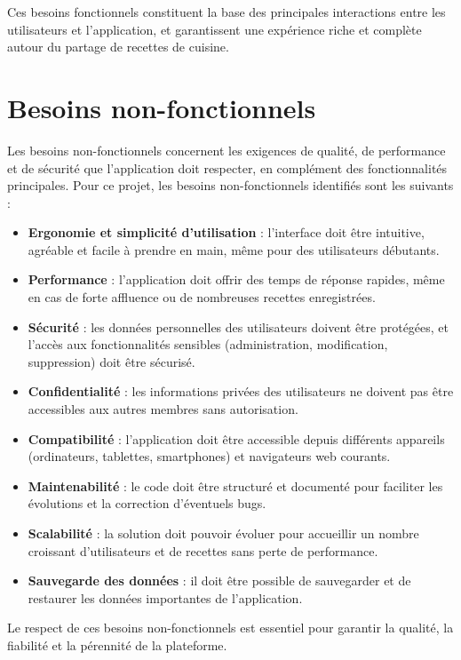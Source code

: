 \documentclass[12pt,a4paper]{report}
\begin{document}
Ces besoins fonctionnels constituent la base des principales interactions entre les utilisateurs et l’application, et garantissent une expérience riche et complète autour du partage de recettes de cuisine.
\section{Besoins non-fonctionnels}

Les besoins non-fonctionnels concernent les exigences de qualité, de performance et de sécurité que l’application doit respecter, en complément des fonctionnalités principales. Pour ce projet, les besoins non-fonctionnels identifiés sont les suivants :

\begin{itemize}
    \item \textbf{Ergonomie et simplicité d’utilisation} : l’interface doit être intuitive, agréable et facile à prendre en main, même pour des utilisateurs débutants.
    \item \textbf{Performance} : l’application doit offrir des temps de réponse rapides, même en cas de forte affluence ou de nombreuses recettes enregistrées.
    \item \textbf{Sécurité} : les données personnelles des utilisateurs doivent être protégées, et l’accès aux fonctionnalités sensibles (administration, modification, suppression) doit être sécurisé.
    \item \textbf{Confidentialité} : les informations privées des utilisateurs ne doivent pas être accessibles aux autres membres sans autorisation.
    \item \textbf{Compatibilité} : l’application doit être accessible depuis différents appareils (ordinateurs, tablettes, smartphones) et navigateurs web courants.
    \item \textbf{Maintenabilité} : le code doit être structuré et documenté pour faciliter les évolutions et la correction d’éventuels bugs.
    \item \textbf{Scalabilité} : la solution doit pouvoir évoluer pour accueillir un nombre croissant d’utilisateurs et de recettes sans perte de performance.
    \item \textbf{Sauvegarde des données} : il doit être possible de sauvegarder et de restaurer les données importantes de l’application.
\end{itemize}

Le respect de ces besoins non-fonctionnels est essentiel pour garantir la qualité, la fiabilité et la pérennité de la plateforme.
\end{document}
